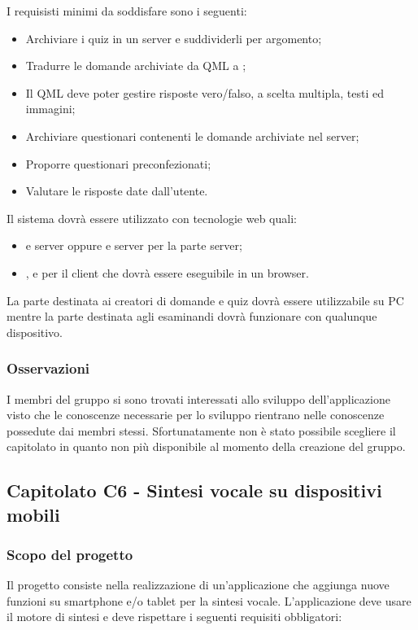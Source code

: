I requisisti minimi da soddisfare sono i seguenti:
\begin{itemize}
	\item Archiviare i quiz in un server e suddividerli per argomento;
	\item Tradurre le domande archiviate da QML a ;
	\item Il QML deve poter gestire risposte vero/falso, a scelta multipla, testi ed immagini;
	\item Archiviare questionari contenenti le domande archiviate nel server;
	\item Proporre questionari preconfezionati;
	\item Valutare le risposte date dall'utente.
\end{itemize}

Il sistema dovrà essere utilizzato con tecnologie web quali:
\begin{itemize}
	\item {} e server  oppure  e server  per la parte server;
	\item {},  e  per il client che dovrà essere eseguibile in un browser.
\end{itemize}
La parte destinata ai creatori di domande e quiz dovrà essere utilizzabile su PC mentre la parte destinata agli esaminandi
dovrà funzionare con qualunque dispositivo.

\subsubsection{Osservazioni}
I membri del gruppo si sono trovati interessati allo sviluppo dell'applicazione visto che le conoscenze necessarie per lo sviluppo rientrano nelle conoscenze possedute dai membri stessi. Sfortunatamente non è stato possibile scegliere il capitolato in quanto non più disponibile al momento della creazione del gruppo.

\subsection{Capitolato C6 - Sintesi vocale su dispositivi mobili}
\subsubsection{Scopo del progetto}
Il progetto consiste nella realizzazione di un'applicazione che aggiunga nuove funzioni su smartphone e/o tablet per la sintesi vocale.
L'applicazione deve usare il motore di sintesi  e deve rispettare i seguenti requisiti obbligatori:

